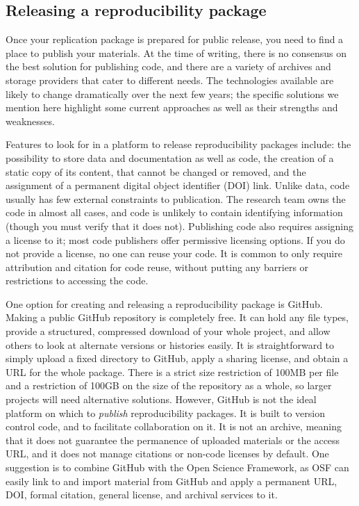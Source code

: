 \subsection{Releasing a reproducibility package}

Once your replication package is prepared for public release,
you need to find a place to publish your materials.
At the time of writing, there is no consensus on the best solution for publishing code,
and there are a variety of archives and storage providers
that cater to different needs.
The technologies available are likely to change dramatically
over the next few years;
the specific solutions we mention here highlight some current approaches
as well as their strengths and weaknesses.

Features to look for in a platform to release reproducibility packages include:
the possibility to store data and documentation as well as code,
the creation of a static copy of its content, that cannot be changed or removed,
and the assignment of a permanent digital object identifier (DOI) link.
Unlike data, code usually has few external constraints to publication.
The research team owns the code in almost all cases,
and code is unlikely to contain identifying information
(though you must verify that it does not).
Publishing code also requires assigning a license to it;
most code publishers offer permissive licensing options.
If you do not provide a license, no one can reuse your code.
It is common to only require attribution and citation for code reuse,
without putting any barriers or restrictions to accessing the code.

One option for creating and releasing a reproducibility package is GitHub.
Making a public GitHub repository is completely free.
It can hold any file types,
provide a structured, compressed download of your whole project,
and allow others to look at alternate versions or histories easily.
It is straightforward to simply upload a fixed directory to GitHub,
apply a sharing license, and obtain a URL for the whole package.
There is a strict size restriction of 100MB per file and
a restriction of 100GB on the size of the repository as a whole,
so larger projects will need alternative solutions.
However, GitHub is not the ideal platform
on which to \textit{publish} reproducibility packages.
It is built to version control code, and to facilitate collaboration on it.
It is not an archive, meaning that it does not guarantee the permanence
of uploaded materials or the access URL,
and it does not manage citations or non-code licenses by default.
One suggestion is to combine GitHub with the Open Science Framework,
as OSF can easily link to and import material from GitHub and
apply a permanent URL, DOI, formal citation, general license, and archival services to it.

